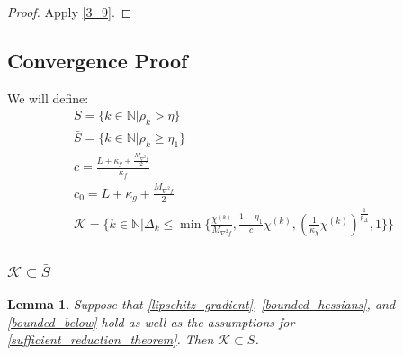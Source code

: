 \documentclass{article}
\newtheorem{lemma}[theorem]{Lemma}
\theoremstyle{case}
\newcommand{\dk}{\Delta_k}
\newcommand{\chik}{{\chi^{(k)}}}
\newcommand{\ints}{\mathbb N} %
\newcommand{\rk}{\rho_k}
\newcommand{\hfb}{{M_{\nabla^2 f}}}
\begin{document}
\begin{proof}
Apply \cref{3_9}.

\end{proof}

\subsection{Convergence Proof}
We will define:
\begin{align}
S = \{k \in \ints | \rk > \eta \} \\
\bar{S} = \{k \in \ints | \rk \ge \eta_1 \} \\
c = \frac{L + \kappa_{g} + \frac {\hfb} 2}{\kappa_f} \\
c_0 = L + \kappa_{g} + \frac {\hfb} 2 \\
\mathcal K = \big \{ k \in \ints | \dk \le \min \{ \frac {\chik}{\hfb}, \frac{1-\eta_1}{c}\chik, \left(\frac 1 {\kappa_{\chi}}  \chik\right)^{\frac 1 {p_{\Delta}}}, 1 \} \big \} \label{define_mathcal_k}
\end{align}



\subsubsection{$\mathcal K \subset \bar{S}$}
\begin{lemma}
\label{mathcal_k_subset_bar_s}
Suppose that \cref{lipschitz_gradient},  \cref{bounded_hessians}, and \cref{bounded_below} hold as well as the assumptions for 
\cref{sufficient_reduction_theorem}.
Then $\mathcal K \subset \bar{S}$.
\end{lemma}
 
\end{document}
